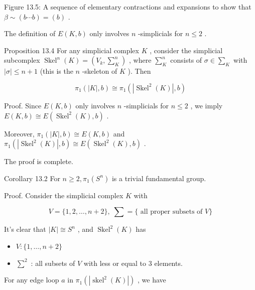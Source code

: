 Figure 13.5: A sequence of elementary contractions and expansions to show that \(\beta  \sim  \left( {b\cdots b}\right)  = \left( b\right)\) .

The definition of \(E\left( {K,b}\right)\) only involves \(n\) -simplicials for \(n \leq  2\) .

Proposition 13.4 For any simplicial complex \(K\) , consider the simplicial subcomplex \({\operatorname{Skel}}^{n}\left( K\right)  = \left( {{V}_{k},{\sum }_{K}^{n}}\right)\) , where \({\sum }_{K}^{n}\) consists of \(\sigma  \in  {\sum }_{K}\) with \(\left| \sigma \right|  \leq  n + 1\) (this is the \(n\) -skeleton of \(K\) ). Then

\[
{\pi }_{1}\left( {\left| K\right| ,b}\right)  \cong  {\pi }_{1}\left( {\left| {{\operatorname{Skel}}^{2}\left( K\right) }\right| ,b}\right)
\]

Proof. Since \(E\left( {K,b}\right)\) only involves \(n\) -simplicials for \(n \leq  2\) , we imply \(E\left( {K,b}\right)  \cong  E\left( {{\operatorname{Skel}}^{2}\left( K\right) ,b}\right)\) .

Moreover, \({\pi }_{1}\left( {\left| K\right| ,b}\right)  \cong  E\left( {K,b}\right)\) and \({\pi }_{1}\left( {\left| {{\operatorname{Skel}}^{2}\left( K\right) }\right| ,b}\right)  \cong  E\left( {{\operatorname{Skel}}^{2}\left( K\right) ,b}\right)\) .

The proof is complete.

Corollary 13.2 For \(n \geq  2,{\pi }_{1}\left( {S}^{n}\right)\) is a trivial fundamental group.

Proof. Consider the simplicial complex \(K\) with

\[
V = \{ 1,2,\ldots ,n + 2\} ,\;\sum  = \{ \text{ all proper subsets of }V\}
\]

It’s clear that \(\left| K\right|  \cong  {S}^{n}\) , and \({\operatorname{Skel}}^{2}\left( K\right)\) has

\begin{itemize}
\item \(V : \{ 1,\ldots ,n + 2\}\)
\end{itemize}

\begin{itemize}
\item \({\sum }^{2}\) : all subsets of \(V\) with less or equal to 3 elements.
\end{itemize}

For any edge loop \(a\) in \({\pi }_{1}\left( \left| {{\operatorname{skel}}^{2}\left( K\right) }\right| \right)\) , we have


